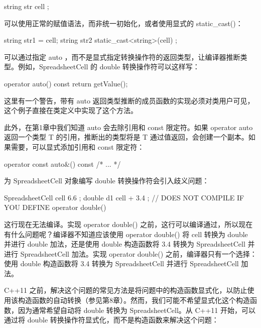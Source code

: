 \begin{cpp}
string str { cell };
\end{cpp}

可以使用正常的赋值语法，而非统一初始化，或者使用显式的 static\_cast()：

\begin{cpp}
string str1 = cell;
string str2 { static_cast<string>(cell) };
\end{cpp}



可以通过指定 auto ，而不是显式指定转换操作符的返回类型，让编译器推断类型。例如，SpreadsheetCell 的 double 转换操作符可以这样写：

\begin{cpp}
operator auto() const { return getValue(); }
\end{cpp}

这里有一个警告，带有 auto 返回类型推断的成员函数的实现必须对类用户可见，这个例子直接在类定义中实现了这个方法。

此外，在第1章中我们知道 auto 会去除引用和 const 限定符。如果 operator auto 返回一个类型 T 的引用，推断出的类型将是 T 通过值返回，会创建一个副本。如果需要，可以显式添加引用和 const 限定符：

\begin{cpp}
operator const auto&() const { /* ... */ }
\end{cpp}


为 SpreadsheetCell 对象编写 double 转换操作符会引入歧义问题：

\begin{cpp}
SpreadsheetCell cell { 6.6 };
double d1 { cell + 3.4 }; // DOES NOT COMPILE IF YOU DEFINE operator double()
\end{cpp}

这行现在无法编译。实现 operator double() 之前，这行可以编译通过，所以现在有什么问题呢？编译器不知道应该使用 operator double() 将 cell 转换为 double 并进行 double 加法，还是使用 double 构造函数将 3.4 转换为 SpreadsheetCell 并进行 SpreadsheetCell 加法。实现 operator double() 之前，编译器只有一个选择：使用 double 构造函数将 3.4 转换为 SpreadsheetCell 并进行 SpreadsheetCell 加法。

C++11 之前，解决这个问题的常见方法是将问题中的构造函数显式化，以防止使用该构造函数的自动转换（参见第8章）。然而，我们可能不希望显式化这个构造函数，因为通常希望自动将 double 转换为 SpreadsheetCell。从 C++11 开始，可以通过将 double 转换操作符显式化，而不是构造函数来解决这个问题：


